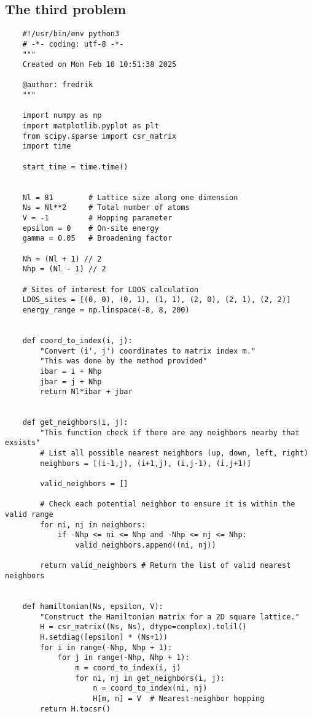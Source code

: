 \subsection{The third problem}
\begin{verbatim}
    #!/usr/bin/env python3
    # -*- coding: utf-8 -*-
    """
    Created on Mon Feb 10 10:51:38 2025
    
    @author: fredrik
    """
    
    import numpy as np
    import matplotlib.pyplot as plt
    from scipy.sparse import csr_matrix
    import time  
    
    start_time = time.time()
    
    
    Nl = 81        # Lattice size along one dimension
    Ns = Nl**2     # Total number of atoms
    V = -1         # Hopping parameter
    epsilon = 0    # On-site energy
    gamma = 0.05   # Broadening factor
    
    Nh = (Nl + 1) // 2
    Nhp = (Nl - 1) // 2
    
    # Sites of interest for LDOS calculation
    LDOS_sites = [(0, 0), (0, 1), (1, 1), (2, 0), (2, 1), (2, 2)]
    energy_range = np.linspace(-8, 8, 200)
    
    
    def coord_to_index(i, j):
        "Convert (i', j') coordinates to matrix index m."
        "This was done by the method provided"
        ibar = i + Nhp 
        jbar = j + Nhp
        return Nl*ibar + jbar
    
    
    def get_neighbors(i, j):
        "This function check if there are any neighbors nearby that exsists"
        # List all possible nearest neighbors (up, down, left, right)
        neighbors = [(i-1,j), (i+1,j), (i,j-1), (i,j+1)]   
        
        valid_neighbors = []
    
        # Check each potential neighbor to ensure it is within the valid range
        for ni, nj in neighbors:
            if -Nhp <= ni <= Nhp and -Nhp <= nj <= Nhp:
                valid_neighbors.append((ni, nj))  
    
        return valid_neighbors # Return the list of valid nearest neighbors
    
    
    def hamiltonian(Ns, epsilon, V):
        "Construct the Hamiltonian matrix for a 2D square lattice."
        H = csr_matrix((Ns, Ns), dtype=complex).tolil()
        H.setdiag([epsilon] * (Ns+1))    
        for i in range(-Nhp, Nhp + 1):
            for j in range(-Nhp, Nhp + 1):
                m = coord_to_index(i, j)
                for ni, nj in get_neighbors(i, j):
                    n = coord_to_index(ni, nj)
                    H[m, n] = V  # Nearest-neighbor hopping
        return H.tocsr()
    

\end{verbatim}

